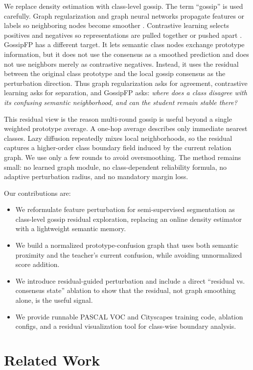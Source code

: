 \documentclass[10pt,twocolumn,letterpaper]{article}
\begin{document}
We replace density estimation with class-level gossip. The term ``gossip'' is used carefully. Graph regularization and graph neural networks propagate features or labels so neighboring nodes become smoother \cite{kipf2017gcn}. Contrastive learning selects positives and negatives so representations are pulled together or pushed apart \cite{he2020moco,li2021pcl}. GossipFP has a different target. It lets semantic class nodes exchange prototype information, but it does not use the consensus as a smoothed prediction and does not use neighbors merely as contrastive negatives. Instead, it uses the residual between the original class prototype and the local gossip consensus as the perturbation direction. Thus graph regularization asks for agreement, contrastive learning asks for separation, and GossipFP asks: \emph{where does a class disagree with its confusing semantic neighborhood, and can the student remain stable there?}

This residual view is the reason multi-round gossip is useful beyond a single weighted prototype average. A one-hop average describes only immediate nearest classes. Lazy diffusion repeatedly mixes local neighborhoods, so the residual captures a higher-order class boundary field induced by the current relation graph. We use only a few rounds to avoid oversmoothing. The method remains small: no learned graph module, no class-dependent reliability formula, no adaptive perturbation radius, and no mandatory margin loss.

Our contributions are:
\begin{itemize}
    \item We reformulate feature perturbation for semi-supervised segmentation as class-level gossip residual exploration, replacing an online density estimator with a lightweight semantic memory.
    \item We build a normalized prototype-confusion graph that uses both semantic proximity and the teacher's current confusion, while avoiding unnormalized score addition.
    \item We introduce residual-guided perturbation and include a direct ``residual vs. consensus state'' ablation to show that the residual, not graph smoothing alone, is the useful signal.
    \item We provide runnable PASCAL VOC and Cityscapes training code, ablation configs, and a residual visualization tool for class-wise boundary analysis.
\end{itemize}

\section{Related Work}
\end{document}
